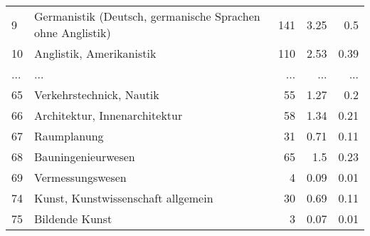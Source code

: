 \begin{longtable}{lXrrr}
        9 & \multicolumn{1}{X}{Germanistik (Deutsch, germanische Sprachen ohne Anglistik)} & %
          \num{141} &
          \num[round-mode=places,round-precision=2]{3,25} &
          \num[round-mode=places,round-precision=2]{0,5} \\
        10 & \multicolumn{1}{X}{Anglistik, Amerikanistik} & %
          \num{110} &
          \num[round-mode=places,round-precision=2]{2,53} &
          \num[round-mode=places,round-precision=2]{0,39} \\
       ... & ... & ... & ... & ... \\
        65 & \multicolumn{1}{X}{Verkehrstechnick, Nautik} & %
          \num{55} &
          \num[round-mode=places,round-precision=2]{1,27} &
          \num[round-mode=places,round-precision=2]{0,2} \\

        66 & \multicolumn{1}{X}{Architektur, Innenarchitektur} & %
          \num{58} &
          \num[round-mode=places,round-precision=2]{1,34} &
          \num[round-mode=places,round-precision=2]{0,21} \\

        67 & \multicolumn{1}{X}{Raumplanung} & %
          \num{31} &
          \num[round-mode=places,round-precision=2]{0,71} &
          \num[round-mode=places,round-precision=2]{0,11} \\

        68 & \multicolumn{1}{X}{Bauningenieurwesen} & %
          \num{65} &
          \num[round-mode=places,round-precision=2]{1,5} &
          \num[round-mode=places,round-precision=2]{0,23} \\

        69 & \multicolumn{1}{X}{Vermessungswesen} & %
          \num{4} &
          \num[round-mode=places,round-precision=2]{0,09} &
          \num[round-mode=places,round-precision=2]{0,01} \\

        74 & \multicolumn{1}{X}{Kunst, Kunstwissenschaft allgemein} & %
          \num{30} &
          \num[round-mode=places,round-precision=2]{0,69} &
          \num[round-mode=places,round-precision=2]{0,11} \\

        75 & \multicolumn{1}{X}{Bildende Kunst} & %
          \num{3} &
          \num[round-mode=places,round-precision=2]{0,07} &
          \num[round-mode=places,round-precision=2]{0,01} \\


\end{longtable}
